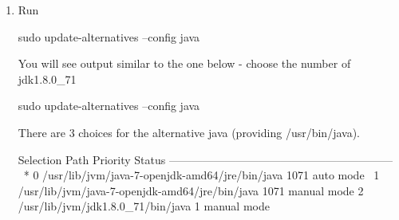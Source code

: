 \begin{enumerate}
\item Run

\begin{sourcecode}
    		sudo update-alternatives --config java
\end{sourcecode}

    You will see output similar to the one below - choose the number of jdk1.8.0\_71

\begin{sourcecode}
    sudo update-alternatives --config java
\end{sourcecode}
    There are 3 choices for the alternative java (providing /usr/bin/java).

\begin{sourcecode}
      Selection    Path                                            Priority   Status
    ------------------------------------------------------------ \
    *  0            /usr/lib/jvm/java-7-openjdk-amd64/jre/bin/java   1071      auto mode \
      1            /usr/lib/jvm/java-7-openjdk-amd64/jre/bin/java   1071      manual mode
      2            /usr/lib/jvm/jdk1.8.0\_71/bin/java                   1         manual mode
\end{sourcecode}

\end{enumerate}
 


